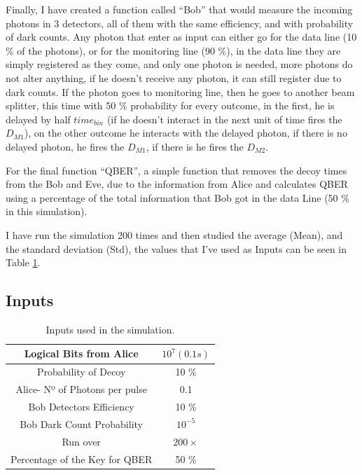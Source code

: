\begin{refsection}
Finally, I have created a function called ``Bob'' that would measure the incoming photons in 3 detectors, all of them with the same efficiency, and with probability of dark counts. Any photon that enter as input can either go for the data line (10 \% of the photons), or for the monitoring line (90 \%), in the data line they are simply registered as they come, and only one photon is needed, more photons do not alter anything, if he doesn't receive any photon, it can still register due to dark counts. If the photon goes to monitoring line, then he goes to another beam splitter, this time with 50 \% probability for every outcome, in the first, he is delayed by half $time_{bin}$ (if he doesn't interact in the next unit of time fires the $D_{M1}$), on the other outcome he interacts with the delayed photon, if there is no delayed photon, he fires the $D_{M1}$, if there is he fires the $D_{M2}$.

For the final function ``QBER'', a simple function that removes the decoy times from the Bob and Eve, due to the information from Alice and calculates QBER using a percentage of the total information that Bob got in the data Line (50 \% in this simulation).

I have run the simulation 200 times and then studied the average (Mean), and the standard deviation (Std), the values that I've used as Inputs can be seen in Table \ref{Inputs}.

\subsection*{Inputs}

\begin{table}[hbt!]
	\centering
	\begin{tabular}{|c|c|}
		\hline
		Logical Bits from Alice & $10^{7} (0.1 s)$ \\ \hline
		Probability of Decoy & 10 \% \\ \hline
		Alice- Nº of Photons per pulse & 0.1\\ \hline
		Bob Detectors Efficiency & 10 \% \\ \hline
		Bob Dark Count Probability & $10^{-5}$ \\ \hline
		Run over & $200 \times$\\ \hline
		Percentage of the Key for QBER & 50 \% \\ \hline
	\end{tabular}
	\caption{Inputs used in the simulation.}
	\label{Inputs}
\end{table}


\end{refsection}
